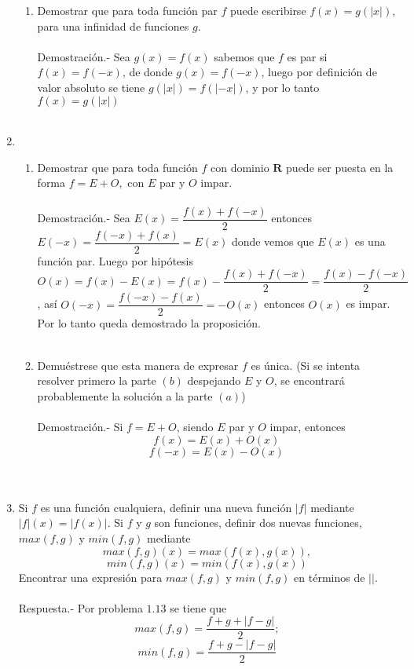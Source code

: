 \begin{enumerate}[\bfseries 1.]
\begin{enumerate}[\bfseries (a)]
	    \item Demostrar que para toda función par $f$ puede escribirse $f(x)=g(|x|)$, para una infinidad de funciones $g$.\\\\
	    Demostración.-\; Sea $g(x)=f(x)$ sabemos que $f$ es par si $f(x)=f(-x)$, de donde $g(x)=f(-x)$, luego  por definición de valor absoluto se tiene $g(|x|)=f(|-x|)$, y por lo tanto $f(x)=g(|x|)$\\\\

	\end{enumerate}

	\item 
	\begin{enumerate}[\bfseries (a)]

	    \item Demostrar que para toda función $f$ con dominio $\mathbf{R}$ puede ser puesta en la forma $f=E+O,$ con $E$ par y $O$ impar.\\\\
	Demostración.-\; Sea $E(x) = \dfrac{f(x) + f(-x)}{2}$ entonces $E(-x) = \dfrac{f(-x) + f(x)}{2} = E(x)$ donde vemos que $E(x)$ es una función par. Luego por hipótesis $O(x) = f(x) - E(x) = f(x) - \dfrac{f(x)+f(-x)}{2} = \dfrac{f(x)-f(-x)}{2}$, así $O(-x) = \dfrac{f(-x)-f(x)}{2} = -O(x)$ entonces $O(x)$ es impar. Por lo tanto queda demostrado la proposición.\\\\

	    \item Demuéstrese que esta manera de expresar $f$ es única. (Si se intenta resolver primero la parte $(b)$ despejando $E$ y $O$, se encontrará probablemente la solución a la parte $(a)$)\\\\
	    Demostración.-\; Si $f=E+O$, siendo $E$ par y $O$ impar, entonces $$f(x)=E(x)+O(x)$$ $$f(-x)=E(x)-O(x)$$\\\\

	\end{enumerate}

	\item Si $f$ es una función cualquiera, definir una nueva función $|f|$ mediante $|f|(x)=|f(x)|$. Si $f$ y $g$ son funciones, definir dos nuevas funciones, $max(f,g)$ y $min(f,g)$ mediante $$max(f,g)(x)=max(f(x),g(x)),$$ $$min(f,g)(x)=min(f(x),g(x))$$ Encontrar una expresión para $max(f,g)$ y $min(f,g)$ en términos de $| |$.\\\\
	Respuesta.-\; Por problema $1.13$ se tiene que $$max(f,g)=\dfrac{f+g+|f-g|}{2};$$ $$min(f,g)=\dfrac{f+g-|f-g|}{2}$$\\\\


\end{enumerate}
